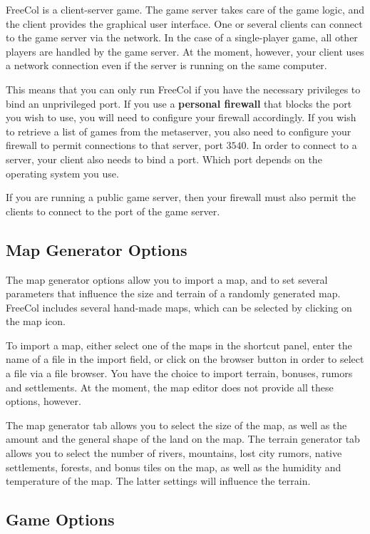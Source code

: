 \documentclass[12pt]{book}
\newcommand{\Concept}[1]{\index{#1}\hypertarget{#1}{\textbf{#1}}}
\begin{document}
FreeCol is a client-server game. The game server takes care of the
game logic, and the client provides the graphical user interface. One
or several clients can connect to the game server via the network. In
the case of a single-player game, all other players are handled by the
game server. At the moment, however, your client uses a network
connection even if the server is running on the same computer.

This means that you can only run FreeCol if you have the necessary
privileges to bind an unprivileged port. If you use a
\Concept{personal firewall} that blocks the port you wish to use, you
will need to configure your firewall accordingly. If you wish to
retrieve a list of games from the metaserver, you also need to
configure your firewall to permit connections to that server, port
$3540$. In order to connect to a server, your client also needs to
bind a port. Which port depends on the operating system you use.

If you are running a public game server, then your firewall must also
permit the clients to connect to the port of the game server.


\hypertarget{map generator options}{\subsection{Map Generator Options}}

The map generator options allow you to import a map, and to set
several parameters that influence the size and terrain of a randomly
generated map. FreeCol includes several hand-made maps, which can be
selected by clicking on the map icon.

To import a map, either select one of the maps in the shortcut panel,
enter the name of a file in the import field, or click on the browser
button in order to select a file via a file browser. You have the
choice to import terrain, bonuses, rumors and settlements. At the
moment, the map editor does not provide all these options, however.

The map generator tab allows you to select the size of the map, as
well as the amount and the general shape of the land on the map. The
terrain generator tab allows you to select the number of rivers,
mountains, lost city rumors, native settlements, forests, and bonus
tiles on the map, as well as the humidity and temperature of the
map. The latter settings will influence the terrain.


\hypertarget{game options}{\subsection{Game Options}}
\end{document}
